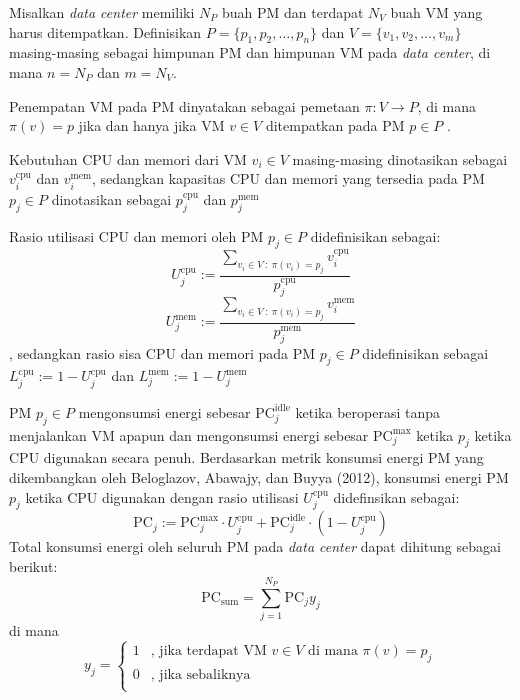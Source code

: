 Misalkan \textit{data center} memiliki $N_P$ buah PM dan terdapat $N_V$ buah VM yang harus ditempatkan. Definisikan $P=\{p_1,p_2,\dots,p_n\}$ dan $V=\{v_1,v_2,\dots,v_m\}$ masing-masing sebagai himpunan PM dan himpunan VM pada \textit{data center}, di mana $n=N_P$ dan $m=N_V$. 

Penempatan VM pada PM dinyatakan sebagai pemetaan $\pi : V \rightarrow P$, di mana $\pi(v)=p$ jika dan hanya jika VM $v \in V$ ditempatkan pada PM $p \in P$ .

Kebutuhan CPU dan memori dari VM $v_i \in V$ masing-masing dinotasikan sebagai $v_i^\text{cpu}$ dan $v_i^\text{mem}$, sedangkan kapasitas CPU dan memori yang tersedia pada PM $p_j \in P$ dinotasikan sebagai $p_j^\text{cpu}$ dan $p_j^\text{mem}$

Rasio utilisasi CPU dan memori oleh PM $p_j \in P$ didefinisikan sebagai:
\begin{equation*}U_j^\text{cpu}:= \frac{\displaystyle\sum_{v_i \in V\ :\ \pi(v_i)=p_j} v_i^\text{cpu}}{p_j^\text{cpu}}\end{equation*}
\begin{equation*}U_j^\text{mem}:=\frac{\displaystyle\sum_{v_i \in V\ :\ \pi(v_i)=p_j }v_i^\text{mem}}{p_j^\text{mem}}\end{equation*}
, sedangkan rasio sisa CPU dan memori pada PM $p_j \in P$ didefinisikan sebagai $L_j^\text{cpu}:= 1-U_j^\text{cpu}$ dan $L_j^\text{mem}:= 1-U_j^\text{mem}$

PM $p_j \in P$ mengonsumsi energi sebesar $\text{PC}_j^\text{idle}$ ketika beroperasi tanpa menjalankan VM apapun dan mengonsumsi energi sebesar $\text{PC}_j^\text{max}$ ketika $p_j$ ketika CPU digunakan secara penuh. Berdasarkan metrik konsumsi energi PM yang dikembangkan oleh Beloglazov, Abawajy, dan Buyya (2012), konsumsi energi PM $p_j$ ketika CPU digunakan dengan rasio utilisasi $U_j^\text{cpu}$ didefinsikan sebagai:
\begin{equation*}\text{PC}_j:=\text{PC}_j^{\max} \cdot U_j^\text{cpu} +\text{PC}_j^\text{idle} \cdot (1- U_j^\text{cpu})\end{equation*}
Total konsumsi energi oleh seluruh PM pada \textit{data center} dapat dihitung sebagai berikut:
\begin{equation*}\text{PC}_\text{sum}=\sum_{j=1}^{N_P}\text{PC}_jy_j\end{equation*}
di mana
\begin{equation*}
y_j=
\begin{cases}
1 & \text{, jika terdapat VM $v \in V$ di mana $\pi(v)=p_j$} \\
0 & \text{, jika sebaliknya} \\
\end{cases}
\end{equation*}


